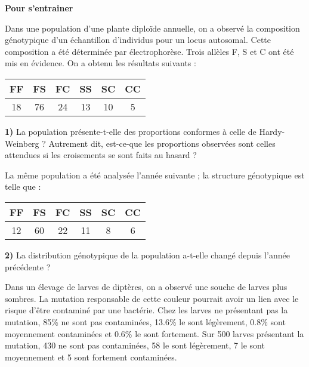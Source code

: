 \documentclass{article}
\numberwithin{equation}{section}
\begin{document}
\iffalse %

\bigskip

\begin{center}
\bf \large Pour s'entrainer  
\end{center}
\bigskip


Dans une population d'une plante diploïde annuelle, on a observé la composition génotypique d'un échantillon d'individus pour un locus autosomal. Cette composition a été déterminée par électrophorèse. Trois allèles F, S et C ont été mis en évidence. On a obtenu les résultats suivants :



\begin{center}
\begin{tabular}{|c|c|c|c|c|c|}
\hline 
FF&FS&FC&SS&SC&CC\\
\hline 
18&76&24&13&10&5\\
\hline
\end{tabular}
\end{center}
{\bf 1)} La population présente-t-elle des proportions conformes à celle de Hardy-Weinberg ? Autrement dit, est-ce-que les proportions observées sont celles attendues si les croisements se sont faits au hasard ?

    La même population a été analysée l'année suivante ; la structure génotypique est telle que :
    
\begin{center}
\begin{tabular}{|c|c|c|c|c|c|}
\hline 
FF&FS&FC&SS&SC&CC\\
\hline 
12&60&22&11& 8& 6\\
\hline 
\end{tabular}
\end{center}
{\bf 2)}
La distribution génotypique de la population a-t-elle changé depuis l'année précédente ?\\

\bigskip



Dans un élevage de larves de diptères, on a observé une souche de larves plus sombres.
La mutation responsable de cette couleur pourrait avoir un lien avec le risque d'être contaminé par une bactérie. Chez les larves ne présentant pas la mutation, 85\% ne sont pas contaminées, 13.6\% le sont légèrement, 0.8\% sont moyennement contaminées et 0.6\% le sont fortement.  Sur 500 larves présentant la mutation, 
430 ne sont pas contaminées,  58 le sont légèrement, 7 le sont moyennement et  5 sont fortement contaminées.
\end{document}
